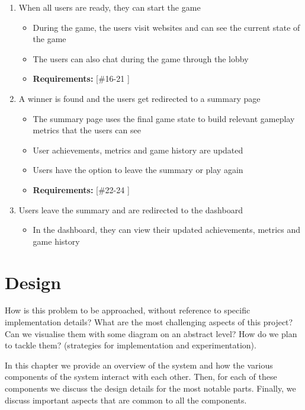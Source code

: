 \documentclass{l4proj}
\begin{document}
\begin{enumerate}
\begin{itemize}
    \end{itemize}
    \item When all users are ready, they can start the game
    \begin{itemize}
 	\item During the game, the users visit websites and can see the current state of the game 
           \item The users can also chat during the game through the lobby
 	\item \textbf{Requirements: } [\#16-21 ]
    \end{itemize}
    \item A winner is found and the users get redirected to a summary page
    \begin{itemize}
 	\item The summary page uses the final game state to build relevant gameplay metrics that the users can see  
           \item User achievements, metrics and game history are updated
           \item Users have the option to leave the summary or play again
 	\item \textbf{Requirements: } [\#22-24 ]
    \end{itemize}
    \item Users leave the summary and are redirected to the dashboard
    \begin{itemize}
        \item In the dashboard, they can view their updated achievements, metrics and game history
    \end{itemize}

\end{enumerate}


\chapter{Design}
How is this problem to be approached, without reference to specific implementation details? 
What are the most challenging aspects of this project? Can we visualise them with some diagram on an abstract level? How do we plan to tackle them? (strategies for implementation and experimentation).

In this chapter we provide an overview of the system and how the various components of the system interact with each other. Then, for each of these components we discuss the design details for the most notable parts. Finally, we discuss important aspects that are common to all the components. 
\end{document}
